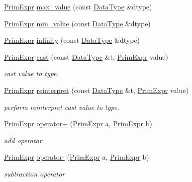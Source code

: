 \begin{DoxyCompactItemize}
\hyperlink{classtvm_1_1PrimExpr}{Prim\+Expr} \hyperlink{namespacetvm_a2741c5a48b50bf369026a1bbdf02017f}{max\+\_\+value} (const \hyperlink{namespacetvm_a41918af1a1dc386388639a9d3ad06c5d}{Data\+Type} \&dtype)
\item 
\hyperlink{classtvm_1_1PrimExpr}{Prim\+Expr} \hyperlink{namespacetvm_a9c126a8dde0d4079713969ca574f172e}{min\+\_\+value} (const \hyperlink{namespacetvm_a41918af1a1dc386388639a9d3ad06c5d}{Data\+Type} \&dtype)
\item 
\hyperlink{classtvm_1_1PrimExpr}{Prim\+Expr} \hyperlink{namespacetvm_a9bf1977e7bc6f0424f4e87d77d0008ed}{infinity} (const \hyperlink{namespacetvm_a41918af1a1dc386388639a9d3ad06c5d}{Data\+Type} \&dtype)
\item 
\hyperlink{classtvm_1_1PrimExpr}{Prim\+Expr} \hyperlink{namespacetvm_aa058caeda9deceda3d6ffeda347be442}{cast} (const \hyperlink{namespacetvm_a41918af1a1dc386388639a9d3ad06c5d}{Data\+Type} \&t, \hyperlink{classtvm_1_1PrimExpr}{Prim\+Expr} value)
\begin{DoxyCompactList}\small\item\em cast value to type. \end{DoxyCompactList}\item 
\hyperlink{classtvm_1_1PrimExpr}{Prim\+Expr} \hyperlink{namespacetvm_a2acd72f0adb3d9ae5eede7497b32c139}{reinterpret} (const \hyperlink{namespacetvm_a41918af1a1dc386388639a9d3ad06c5d}{Data\+Type} \&t, \hyperlink{classtvm_1_1PrimExpr}{Prim\+Expr} value)
\begin{DoxyCompactList}\small\item\em perform reinterpret cast value to type. \end{DoxyCompactList}\item 
\hyperlink{classtvm_1_1PrimExpr}{Prim\+Expr} \hyperlink{namespacetvm_af246f441d4ac21b110185b77240b2dcc}{operator+} (\hyperlink{classtvm_1_1PrimExpr}{Prim\+Expr} a, \hyperlink{classtvm_1_1PrimExpr}{Prim\+Expr} b)
\begin{DoxyCompactList}\small\item\em add operator \end{DoxyCompactList}\item 
\hyperlink{classtvm_1_1PrimExpr}{Prim\+Expr} \hyperlink{namespacetvm_abde487c0197942c4ebb1b47277b89dac}{operator-\/} (\hyperlink{classtvm_1_1PrimExpr}{Prim\+Expr} a, \hyperlink{classtvm_1_1PrimExpr}{Prim\+Expr} b)
\begin{DoxyCompactList}\small\item\em subtraction operator \end{DoxyCompactList}\item 

\end{DoxyCompactItemize}
